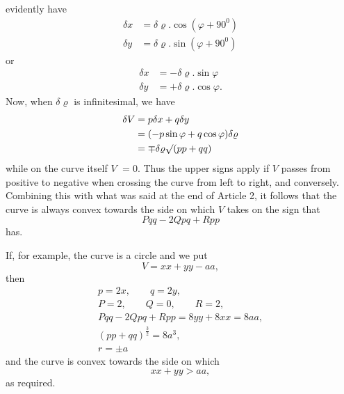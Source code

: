 %
evidently have
\[
\begin{aligned}
\delta x&=\delta\varrho.\cos(\varphi+90^{0})\\
\delta y&=\delta\varrho.\sin(\varphi+90^{0})
\end{aligned}
\]
or
\[
\begin{aligned}
\delta x&=-\delta\varrho.\sin\varphi\\
\delta y&=+\delta\varrho.\cos\varphi.
\end{aligned}
\]
Now, when $\delta\varrho$ is infinitesimal, we have
\[
\begin{aligned}
\delta V&=p\delta x+q\delta y\\
&=(-p\sin\varphi+q\cos\varphi)\delta\varrho\\
&=\mp\delta\varrho\mathord{\surd}(pp+qq)
\end{aligned}
\]
while on the curve itself $V$ $=0$. Thus the upper signs apply if $V$ passes from positive to negative when crossing the curve from left to right, and conversely. Combining this with what was said at the end of Article 2, it follows that the curve is always convex towards the side on which $V$ takes on the sign that
\[
Pqq-2Qpq+Rpp
\]
has.

If, for example, the curve is a circle and we put
\[
V=xx+yy-aa,
\]
then
\[
\begin{gathered}
p=2x,\qquad q=2y,\\
P=2,\qquad Q=0,\qquad R=2,\\
Pqq-2Qpq+Rpp=8yy+8xx=8aa,\\
(pp+qq)^{\frac32}=8a^3,\\
r=\pm a
\end{gathered}
\]
and the curve is convex towards the side on which
\[
xx+yy>aa,
\]
as required.
